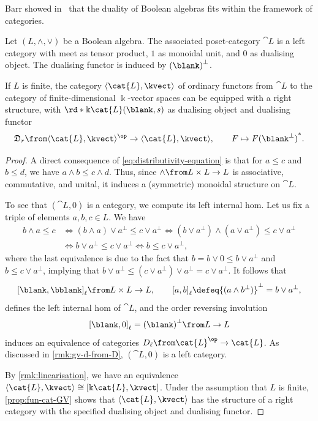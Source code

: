 Barr showed in~\cite{barr79} that the duality of Boolean algebras fits within the framework of \GV{} categories.

\begin{proposition}\label{prop:complement-lattice-form-GV-category}
  Let \((L, \land, \lor)\) be a Boolean algebra.
  The associated poset-category \(\cat{L}\) is a left \GV{} category
  with meet as tensor product, \(1\) as monoidal unit, and \(0\) as dualising object.
  The dualising functor is induced by \({( \blank )}^{\perp}\).

  If \(L\) is finite,
  the category \(\langle\cat{L}, \kvect\rangle\)
  of ordinary functors from \(\cat{L}\)
  to the category of finite\hyp{}dimensional \(\Bbbk\)\hyp{}vector spaces
  can be equipped with a right \GV{} structure,
  with \(\rd*{\Bbbk\cat{L}( \blank , s)}\) as dualising object and dualising functor
  \[
    \mathfrak{D}_r \from \langle \cat{L}, \kvect\rangle^{\op} \to \langle \cat{L}, \kvect\rangle, \qquad
    F \mapsto {F(\blank^{\perp})}^{*}.
  \]
\end{proposition}
\begin{proof}
  A direct consequence of \cref{eq:distributivity-equation} is that for \(a \leq c\) and \(b \leq d\), we have
  \(a \land b \leq c \land d\).
  Thus, since \(\land \from L \times L \to L\) is associative, commutative, and unital, it induces a (symmetric) monoidal structure on \(\cat{L}\).

  To see that \((\cat{L}, 0)\) is a  \GV{} category,
  we compute its left internal hom.
  Let us fix a triple of elements \(a,b,c \in L\).
  We have
  \begin{align*}
    b \land a \leq c
    & \iff (b \land a) \lor a^{\bot} \leq c \lor a^{\bot}
      \iff (b \lor a^{\bot}) \land (a \lor a^{\bot}) \leq c \lor a^{\bot} \\
    & \iff b \lor a^{\bot} \leq c \lor a^{\bot}
      \iff b \leq c \lor a^{\perp},
  \end{align*}
  where the last equivalence is due to the fact that \(b = b \lor 0 \leq b \lor a^{\bot}\)
  and \(b \leq c \lor a^{\perp}\), implying that \(b\lor a^{\perp} \leq (c \lor a^{\perp})\lor a^{\perp}= c \lor a ^{\perp}\).
  It follows that
  \[
    {[\blank, \bblank]}_{\ell} \from L \times L \to L, \qquad {[a, b]}_{\ell} \defeq {(a \land b^{\bot})}^{\bot} = b \lor a^{\perp},
  \]
  defines the left internal hom of \(\cat{L}\),
  and the order reversing involution
  \[
    {[\blank, 0]}_{\ell} = {( \blank )}^{\perp} \from L \to L
  \]
  induces an equivalence of categories \(D_{\ell} \from \cat{L}^{\op}\to\cat{L}\).
  As discussed in \cref{rmk:gv-d-from-D},
  \((\cat{L}, 0)\) is a left \GV{} category.

  By \cref{rmk:linearisation}, we have an equivalence \(\langle \cat{L}, \kvect\rangle \cong [\Bbbk\cat{L}, \kvect]\).
  Under the assumption that \(L\) is finite,
  \cref{prop:fun-cat-GV} shows that \(\langle \cat{L}, \kvect\rangle\) has the structure of a right \GV{} category
  with the specified dualising object and dualising functor.
\end{proof}

